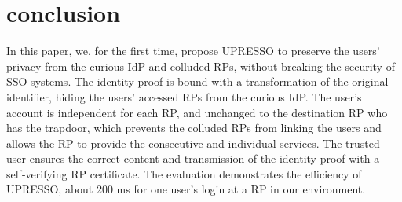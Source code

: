 \section{conclusion}
\label{sec:conclusion}
In this paper, we, for the first time, propose UPRESSO to preserve the users' privacy from the curious IdP and colluded RPs,  without breaking the security of SSO systems. The identity proof is bound with a transformation of the original identifier, hiding the users' accessed RPs from the curious IdP. The user's account is independent for each RP, and unchanged to the destination RP who has the trapdoor, which prevents the colluded RPs from linking the users and allows the RP to provide the consecutive and individual services. The trusted user ensures the correct content and transmission of the identity proof with a self-verifying RP certificate. The evaluation demonstrates the efficiency of UPRESSO, about 200 ms for one user's login at a RP in our environment.
